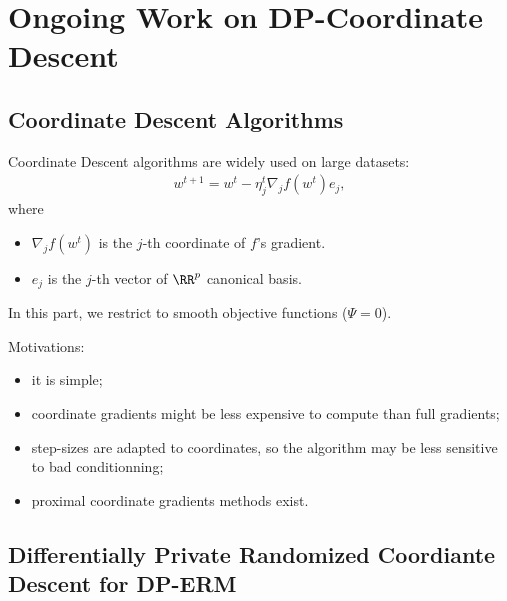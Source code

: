 \documentclass[notheorems]{beamer}
\begin{document}
\section{Ongoing Work on DP-Coordinate Descent}
\label{sec:ongoing_work_on_dp_coordinate_descent}

\subsection{Coordinate Descent Algorithms}
\label{sub:coordinate_descent_algorithms}

\begin{frame}
  Coordinate Descent algorithms  are widely used on large datasets:
  \begin{align*}
    w^{t+1} = w^t - \eta^t_j \nabla_j f(w^t) e_j,
  \end{align*}
  where
  \begin{itemize}
  \item $\nabla_j f(w^t)$ is the $j$-th coordinate of $f$'s gradient.
  \item $e_j$ is the $j$-th vector of $\RR^p$ canonical basis.
  \end{itemize}

  \vspace{1em}

  In this part, we restrict to smooth objective functions ($\Psi = 0$).
\end{frame}

\begin{frame}
  \vspace{1em}

  Motivations:
  \begin{itemize}
  \item it is simple;
  \item coordinate gradients might be less expensive to compute than full gradients;
  \item step-sizes are adapted to coordinates, so the algorithm may be less sensitive to bad conditionning;
  \item proximal coordinate gradients methods exist.
  \end{itemize}
\end{frame}

\subsection{Differentially Private Randomized Coordiante Descent for DP-ERM}
\label{sub:privacy_for_dp_randomized_coordinate_descent}
\end{document}
